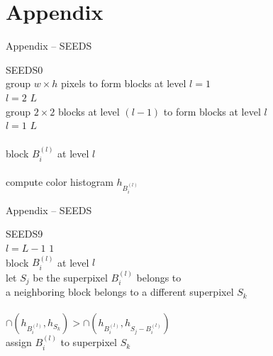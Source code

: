 \documentclass[handout]{beamer}
\begin{document}
	\section*{Appendix}
	\begin{frame}{Appendix -- SEEDS}
		\vspace{-0.7cm}
		\begin{algo}{SEEDS}{\label{algo:superpixel-segmentation-seeds}}{0}
			\\
			group $w \times h$ pixels to form blocks at level $l = 1$\\
			\qfor $l = 2$ \qto $L$\\
				group $2 \times 2$ blocks at level $(l - 1)$ to form blocks at level $l$\qrof\\
			\qfor $l = 1$ \qto $L$\\
				\\
				\qforeach block $B_i^{(l)}$ at level $l$\\
					\\
					compute color histogram $h_{B_i^{(l)}}$\qrof\qrof
		\end{algo}
	\end{frame}
	
	\begin{frame}{Appendix -- SEEDS}
		\begin{algo}{SEEDS}{\label{algo:superpixel-segmentation-seeds}}{9}
			\\
			\qfor $l = L - 1$ \qto $1$\\
				\qforeach block $B_i^{(l)}$ at level $l$\\
					let $S_j$ be the superpixel $B_i^{(l)}$ belongs to\\
					\qif a neighboring block belongs to a different superpixel $S_k$\\
						\\
						\qthen \qif $\cap(h_{B_i^{(l)}}, h_{S_k}) > \cap(h_{B_i^{(l)}}, h_{S_j - B_i^{(l)}})$\\
							\qthen assign $B_i^{(l)}$ to superpixel $S_k$\qfi\qfi\qrof\qrof
		\end{algo}
	\end{frame}
	
\end{document}
